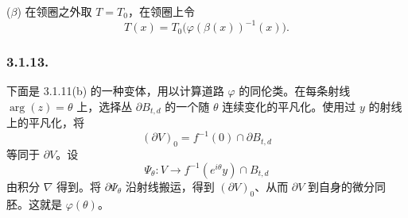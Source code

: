 \medskip
\noindent\textup{($\beta$)} 在领圈之外取 $T=T_0$，在领圈上令
\[
  T(x)=T_0\bigl(\varphi(\beta(x))^{-1}(x)\bigr).
  \]

\subsubsection*{3.1.13.}
下面是 3.1.11(b) 的一种变体，用以计算道路 $\varphi$ 的同伦类。在每条射线 $\arg(z)=\theta$ 上，选择丛 $\partial B_{t,d}$ 的一个随 $\theta$ 连续变化的平凡化。使用过 $y$ 的射线上的平凡化，将
\[
(\partial V)_0=f^{-1}(0)\cap\partial B_{t,d}
\]
等同于 $\partial V$。设
\[
\Psi_\theta:V\longrightarrow
f^{-1}(e^{i\theta}y)\cap B_{t,d}
\]
由积分 $\nabla$ 得到。将 $\partial\Psi_\theta$ 沿射线搬运，得到 $(\partial V)_0$、从而 $\partial V$ 到自身的微分同胚。这就是 $\varphi(\theta)$。